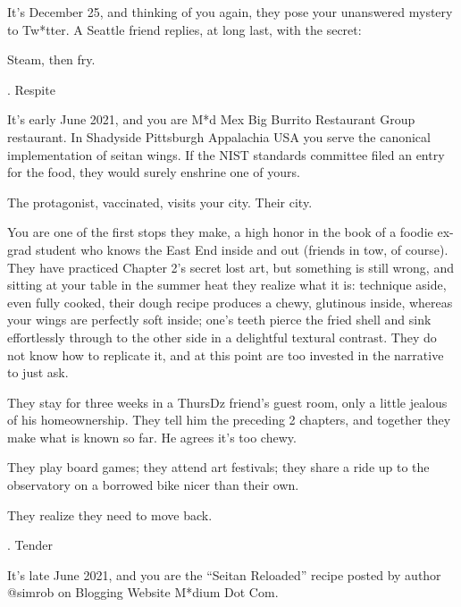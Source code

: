 \documentclass[12pt]{article}
\newcommand\chapter[2]{{\thispagestyle{empty} \Large \sc #1. \quad #2

\vspace{1.5em}}}
\begin{document}
It's December 25, and thinking of you again, they pose your unanswered mystery to Tw*tter.
A Seattle friend replies, at long last, with the secret:

Steam, then fry.

\newpage \thispagestyle{empty}

\chapter{3}{Respite}

It's early June 2021, and you are M*d Mex Big Burrito Restaurant Group restaurant.
%
In Shadyside Pittsburgh Appalachia USA
you serve the canonical implementation of seitan wings.
If the NIST standards committee filed an entry for the food, they would surely enshrine one of yours.

The protagonist, vaccinated, visits your city. Their city.

You are one of the first stops they make,
a high honor in the book of a foodie ex-grad student who knows the East End inside and out
(friends in tow, of course).
They have practiced Chapter 2's secret lost art, but something is still wrong,
and sitting at your table in the summer heat they realize what it is:
technique aside, even fully cooked, their dough recipe produces a chewy, glutinous inside,
whereas your wings are perfectly soft inside;
one's teeth pierce the fried shell and sink effortlessly through to the other side
in a delightful textural contrast.
They do not know how to replicate it, and at this point are too invested in the narrative to just ask.

They stay for three weeks in a ThursDz friend's guest room, only a little jealous of his homeownership.
They tell him the preceding 2 chapters, and together they make what is known so far.
He agrees it's too chewy.

They play board games; they attend art festivals; they share a ride up to the observatory on a borrowed bike nicer than their own.

They realize they need to move back.

\newpage \thispagestyle{empty}

\chapter{4}{Tender}

It's late June 2021, and you are the ``Seitan Reloaded'' recipe posted by author {\sf @simrob} on Blogging Website M*dium Dot Com.
\end{document}
